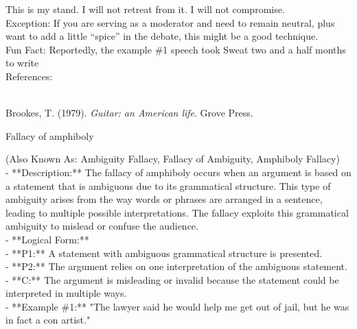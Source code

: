 \documentclass[a4paper,12pt,single,pdftex]{scrbook}
\begin{document}
    
      This is my stand. I will not retreat from it. I will not compromise.
    \\

    
      Exception: If you are serving as a moderator and need to remain neutral, plus want to add a little “spice” in the debate, this might be a good technique.
    \\

    
      Fun Fact: Reportedly, the example \#1 speech took Sweat two and a half months to write
    \\

    References:

    
      
        
      \\

      
        
          Brookes, T. (1979). {\it Guitar: an American life}. Grove Press.
        
      
    
  

Fallacy of amphiboly
    
      (Also Known As: Ambiguity Fallacy, Fallacy of Ambiguity, Amphiboly Fallacy)
    \\

  
    
      - **Description:** The fallacy of amphiboly occurs when an argument is based on a statement that is ambiguous due to its grammatical structure. This type of ambiguity arises from the way words or phrases are arranged in a sentence, leading to multiple possible interpretations. The fallacy exploits this grammatical ambiguity to mislead or confuse the audience.
    \\

    
      - **Logical Form:**
    \\

    
        - **P1:** A statement with ambiguous grammatical structure is presented.
    \\

    
        - **P2:** The argument relies on one interpretation of the ambiguous statement.
    \\

    
        - **C:** The argument is misleading or invalid because the statement could be interpreted in multiple ways.
    \\

    
      - **Example \#1:** "The lawyer said he would help me get out of jail, but he was in fact a con artist."
    \\
\end{document}
